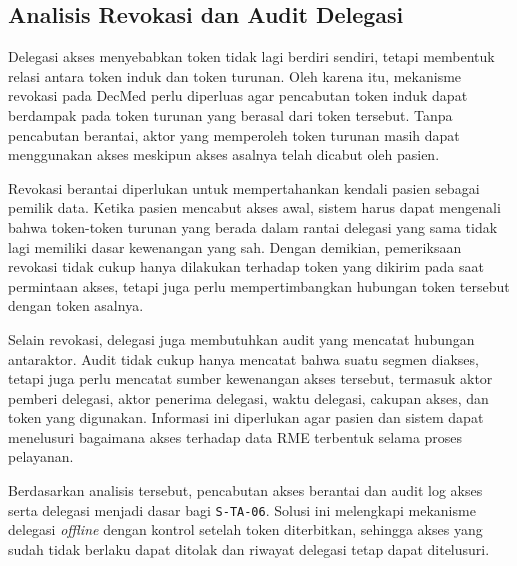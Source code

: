 \subsection{Analisis Revokasi dan Audit Delegasi}
\label{subsec:analisis-revokasi-audit-delegasi}

Delegasi akses menyebabkan token tidak lagi berdiri sendiri, tetapi membentuk relasi antara token induk dan token turunan. Oleh karena itu, mekanisme revokasi pada DecMed perlu diperluas agar pencabutan token induk dapat berdampak pada token turunan yang berasal dari token tersebut. Tanpa pencabutan berantai, aktor yang memperoleh token turunan masih dapat menggunakan akses meskipun akses asalnya telah dicabut oleh pasien.

Revokasi berantai diperlukan untuk mempertahankan kendali pasien sebagai pemilik data. Ketika pasien mencabut akses awal, sistem harus dapat mengenali bahwa token-token turunan yang berada dalam rantai delegasi yang sama tidak lagi memiliki dasar kewenangan yang sah. Dengan demikian, pemeriksaan revokasi tidak cukup hanya dilakukan terhadap token yang dikirim pada saat permintaan akses, tetapi juga perlu mempertimbangkan hubungan token tersebut dengan token asalnya.

Selain revokasi, delegasi juga membutuhkan audit yang mencatat hubungan antaraktor. Audit tidak cukup hanya mencatat bahwa suatu segmen diakses, tetapi juga perlu mencatat sumber kewenangan akses tersebut, termasuk aktor pemberi delegasi, aktor penerima delegasi, waktu delegasi, cakupan akses, dan token yang digunakan. Informasi ini diperlukan agar pasien dan sistem dapat menelusuri bagaimana akses terhadap data RME terbentuk selama proses pelayanan.

Berdasarkan analisis tersebut, pencabutan akses berantai dan audit log akses serta delegasi menjadi dasar bagi \texttt{S-TA-06}. Solusi ini melengkapi mekanisme delegasi \textit{offline} dengan kontrol setelah token diterbitkan, sehingga akses yang sudah tidak berlaku dapat ditolak dan riwayat delegasi tetap dapat ditelusuri.
